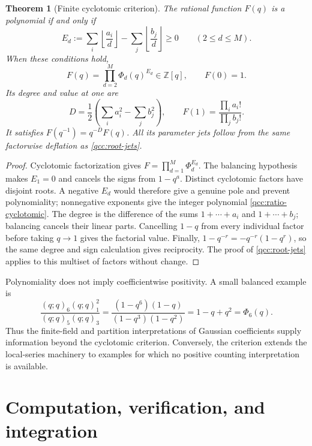 \documentclass[11pt,a4paper,oneside,openany]{book}
\newtheorem{theorem}{Theorem}[chapter]
\theoremstyle{definition}
\theoremstyle{remark}
\newcommand{\Z}{\mathbb Z}
\begin{document}
\begin{theorem}[Finite cyclotomic criterion]\label{qcc:ratio-criterion}
The rational function \(F(q)\) is a polynomial if and only if
\begin{equation}\label{qcc:ratio-floors}
 E_d:=\sum_i\left\lfloor\frac{a_i}{d}\right\rfloor
       -\sum_j\left\lfloor\frac{b_j}{d}\right\rfloor\ge0
       \qquad(2\le d\le M).
\end{equation}
When these conditions hold,
\begin{equation}\label{qcc:ratio-cyclotomic}
 F(q)=\prod_{d=2}^{M}\Phi_d(q)^{E_d}\in\Z[q],\qquad F(0)=1.
\end{equation}
Its degree and value at one are
\begin{equation}\label{qcc:ratio-degree-value}
 D=\frac12\left(\sum_i a_i^2-\sum_j b_j^2\right),\qquad
 F(1)=\frac{\prod_i a_i!}{\prod_j b_j!}.
\end{equation}
It satisfies \(F(q^{-1})=q^{-D}F(q)\). All its parameter jets follow
from the same factorwise deflation as \cref{qcc:root-jets}.
\end{theorem}
\begin{proof}
Cyclotomic factorization gives \(F=\prod_{d=1}^{M}\Phi_d^{E_d}\).
The balancing hypothesis makes \(E_1=0\) and cancels the signs from
\(1-q^a\). Distinct cyclotomic factors have disjoint roots. A negative
\(E_d\) would therefore give a genuine pole and prevent polynomiality;
nonnegative exponents give the integer polynomial
\eqref{qcc:ratio-cyclotomic}. The degree is the difference of the sums
\(1+\cdots+a_i\) and \(1+\cdots+b_j\); balancing cancels their linear
parts. Cancelling \(1-q\) from every individual factor before taking
\(q\to1\) gives the factorial value. Finally,
\(1-q^{-r}=-q^{-r}(1-q^r)\), so the same degree and sign calculation
gives reciprocity. The proof of \cref{qcc:root-jets} applies to this
multiset of factors without change.
\end{proof}

Polynomiality does not imply coefficientwise positivity. A small balanced
example is
\[
 \frac{(q;q)_6(q;q)_1^2}{(q;q)_5(q;q)_3}
 =\frac{(1-q^6)(1-q)}{(1-q^3)(1-q^2)}
 =1-q+q^2=\Phi_6(q).
\]
Thus the finite-field and partition interpretations of Gaussian coefficients
supply information beyond the cyclotomic criterion. Conversely, the criterion
extends the local-series machinery to examples for which no positive counting
interpretation is available.

\chapter{Computation, verification, and integration}
\label{qcc:computation}
\end{document}

